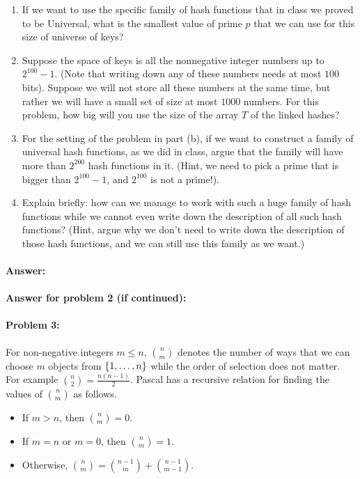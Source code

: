 \documentclass{article}
\begin{document}
\begin{enumerate}[label=\alph*]
\item If we want to use the specific family of hash functions that in class we proved to be Universal, what is the smallest value of prime $p$ that we can use for this size of universe of keys?

\item Suppose the space of keys is all the nonnegative integer numbers up to $2^{100}-1$. (Note that writing down any of these numbers needs at most $100$ bits). Suppose we will not store all these numbers at the same time, but rather we will have a small set of size at most $1000$ numbers. For this problem, how big will you use the size of the array $T$ of the linked hashes?

\item For the setting of the problem in part (b), if we want to construct a family of universal hash functions, as we did in class, argue that the family will have more than $2^{200}$ hash functions in it. (Hint, we need to pick a prime that is bigger than $2^{100}-1$, and $2^{100}$ is not a prime!).

\item Explain briefly: how can we manage to work with such a huge family of hash functions while we cannot even write down the description of all such hash functions? (Hint, argue why we don't need to write down the description of those hash functions, and we can still use this family as we want.)
\end{enumerate}

\paragraph{Answer:}

\newpage
\paragraph{Answer for problem 2 (if continued):}


\newpage
\paragraph{Problem 3:} 
For non-negative integers $m\leq n$, ${n \choose m}$ denotes the number of ways that we can choose $m$ objects from $\{ 1,\dots,n \}$ while the order of selection does not matter. For example ${n \choose 2} = \frac{n (n-1)}{2}$.
Pascal has a recursive relation for finding the values of ${n \choose m}$ as follows.
\begin{itemize}
    \item If $m > n$, then ${n \choose m}=0$.
    \item If $m =n$ or $m=0$, then ${n \choose m}=1$.
    \item Otherwise, ${n \choose m} = {n-1 \choose m} + {n-1 \choose m-1}$.
\end{itemize}
\end{document}
